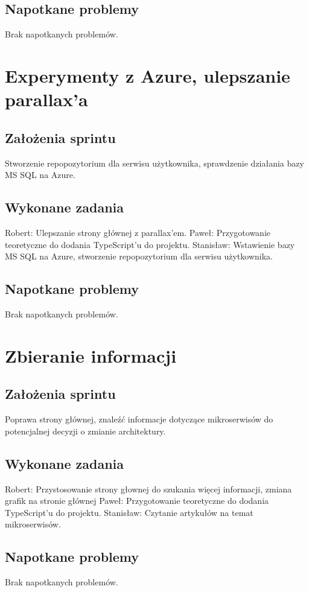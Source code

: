 \documentclass[a4paper,11pt]{report}
\begin{document}
\subsection {Napotkane problemy}
Brak napotkanych problemów.

\section {Experymenty z Azure, ulepszanie parallax'a}
\subsection {Założenia sprintu}
Stworzenie repopozytorium dla serwisu użytkownika, sprawdzenie działania bazy MS SQL na Azure.
\subsection {Wykonane zadania}
Robert: Ulepszanie strony głównej z parallax'em.
Paweł: Przygotowanie teoretyczne do dodania TypeScript'u do projektu.
Stanisław: Wstawienie bazy MS SQL na Azure, stworzenie repopozytorium dla serwisu użytkownika.  
\subsection {Napotkane problemy}
Brak napotkanych problemów.

\section {Zbieranie informacji}
\subsection {Założenia sprintu}
Poprawa strony głównej, znaleźć informacje dotyczące mikroserwisów do potencjalnej decyzji o zmianie architektury.
\subsection {Wykonane zadania}
Robert: Przystosowanie strony głownej do szukania więcej informacji, zmiana grafik na stronie głównej 
Paweł: Przygotowanie teoretyczne do dodania TypeScript'u do projektu. 
Stanisław: Czytanie artykułów na temat mikroserwisów.
\subsection {Napotkane problemy}
Brak napotkanych problemów.
\end{document}
